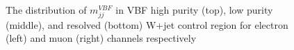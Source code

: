 \begin{figure}[ht]
    \\   
	\caption{The distribution of $m_{jj}^{VBF}$ in VBF high purity (top), low purity (middle), and resolved (bottom) W+jet control region for electron (left) and muon (right) channels respectively}
	\label{Fig:mJJVBFWR}
\end{figure}



